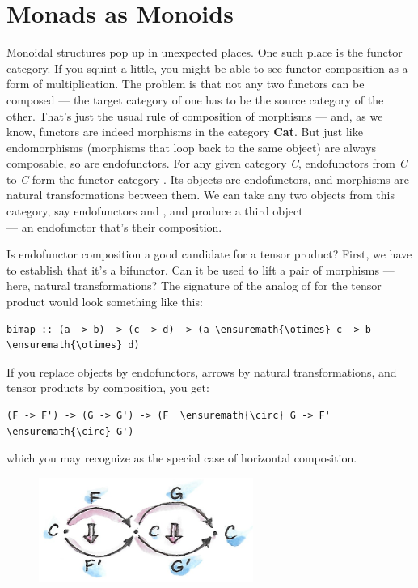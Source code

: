 \section{Monads as Monoids}\label{monads-as-monoids}

Monoidal structures pop up in unexpected places. One such place is the
functor category. If you squint a little, you might be able to see
functor composition as a form of multiplication. The problem is that not
any two functors can be composed --- the target category of one has to
be the source category of the other. That's just the usual rule of
composition of morphisms --- and, as we know, functors are indeed
morphisms in the category \textbf{Cat}. But just like endomorphisms
(morphisms that loop back to the same object) are always composable, so
are endofunctors. For any given category \emph{C}, endofunctors from
\emph{C} to \emph{C} form the functor category \code{{[}C, C{]}}. Its
objects are endofunctors, and morphisms are natural transformations
between them. We can take any two objects from this category, say
endofunctors  and , and produce a third object\\
 --- an endofunctor that's their composition.

Is endofunctor composition a good candidate for a tensor product? First,
we have to establish that it's a bifunctor. Can it be used to lift a
pair of morphisms --- here, natural transformations? The signature of
the analog of  for the tensor product would look something
like this:

\begin{Verbatim}[commandchars=\\\{\}]
bimap :: (a -> b) -> (c -> d) -> (a \ensuremath{\otimes} c -> b \ensuremath{\otimes} d)
\end{Verbatim}
If you replace objects by endofunctors, arrows by natural
transformations, and tensor products by composition, you get:

\begin{Verbatim}[commandchars=\\\{\}]
(F -> F') -> (G -> G') -> (F  \ensuremath{\circ} G -> F'  \ensuremath{\circ} G')
\end{Verbatim}
which you may recognize as the special case of horizontal composition.

\begin{figure}[H]
\centering
\includegraphics[width=70mm]{images/horizcomp.png}
\end{figure}

